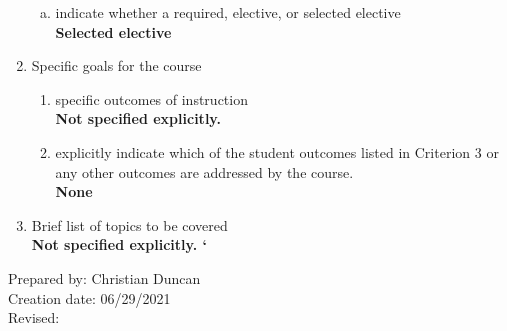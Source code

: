 \begin{enumerate}[1.]
\begin{enumerate}[a.]
\item indicate whether a required, elective, or selected elective\\ %
  {\bfseries
    Selected elective
  }

\end{enumerate}

\item Specific goals for the course
\begin{enumerate}
\item specific outcomes of instruction\\ %
  {\bfseries
  Not specified explicitly.  %
  }

\item explicitly indicate which of the student outcomes listed in Criterion 3 or any other outcomes are addressed by the course.\\
  {\bfseries
    None
  }
\end{enumerate}

\item Brief list of topics to be covered\\
  {\bfseries
  Not specified explicitly.  %
`  }

\end{enumerate}

\noindent Prepared by: Christian Duncan\\
\noindent Creation date: 06/29/2021\\
\noindent Revised:\\
